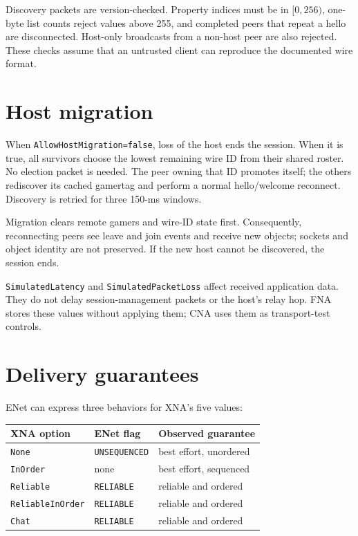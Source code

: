 Discovery packets are version-checked. Property indices must be in $[0,256)$, one-byte list
counts reject values above 255, and completed peers that repeat a hello are disconnected.
Host-only broadcasts from a non-host peer are also rejected. These checks assume that an
untrusted client can reproduce the documented wire format.

\section{Host migration}

When \texttt{AllowHostMigration=false}, loss of the host ends the session. When it is true, all
survivors choose the lowest remaining wire ID from their shared roster. No election packet is
needed. The peer owning that ID promotes itself; the others rediscover its cached gamertag and
perform a normal hello/welcome reconnect. Discovery is retried for three 150-ms windows.

Migration clears remote gamers and wire-ID state first. Consequently, reconnecting peers see
leave and join events and receive new  objects; sockets and object
identity are not preserved. If the new host cannot be discovered, the session ends.

\texttt{SimulatedLatency} and \texttt{SimulatedPacketLoss} affect received application data.
They do not delay session-management packets or the host's relay hop. FNA stores these values
without applying them; CNA uses them as transport-test controls.

\section{Delivery guarantees}

ENet can express three behaviors for XNA's five  values:

\begin{center}
\begin{tabular}{lll}
\toprule
\textbf{XNA option} & \textbf{ENet flag} & \textbf{Observed guarantee} \\
\midrule
\texttt{None} & \texttt{UNSEQUENCED} & best effort, unordered \\
\texttt{InOrder} & none & best effort, sequenced \\
\texttt{Reliable} & \texttt{RELIABLE} & reliable and ordered \\
\texttt{ReliableInOrder} & \texttt{RELIABLE} & reliable and ordered \\
\texttt{Chat} & \texttt{RELIABLE} & reliable and ordered \\
\bottomrule
\end{tabular}
\end{center}

